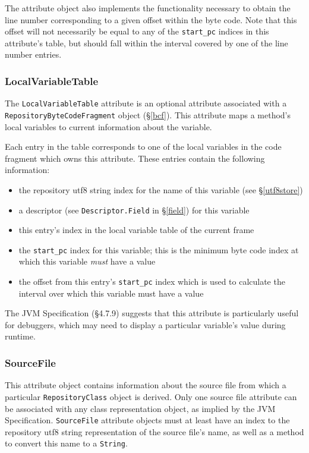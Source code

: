 \documentclass{report}
\begin{document}
The attribute object also implements the functionality necessary to
obtain the line number corresponding to a given offset within the 
byte code. Note that this offset will not necessarily be equal to
any of the \texttt{start\_pc} indices in this attribute's table, but should
fall within the interval covered by one of the line number entries.

\subsubsection{LocalVariableTable}

The \texttt{LocalVariableTable} attribute is an optional attribute associated
with a \texttt{Re\-pos\-i\-tory\-Byte\-Code\-Frag\-ment} object (\S \ref{bcf}).
This attribute maps a method's local variables to current information about 
the variable.

Each entry in the table corresponds to one of the local variables in the
code fragment which owns this attribute. These entries contain the
following information:

\begin{itemize}
	\item the repository utf8 string index for the name of this
	      variable (see \S \ref{utf8store})
	\item a descriptor (see \texttt{Descriptor.Field} in
              \S \ref{field}) for this variable
	\item this entry's index in the local variable table of the current
              frame
	\item the \texttt{start\_pc} index for this variable; this is
              the minimum byte code index at which this variable {\em must}
              have a value
	\item the offset from this entry's \texttt{start\_pc} index which
	      is used to calculate the interval over which this variable
              must have a value
\end{itemize}

The JVM Specification (\S 4.7.9) suggests that this attribute is 
particularly useful for debuggers, which may need to display
a particular variable's value during runtime.

\subsubsection{SourceFile}

This attribute object contains information about the source file from which a 
particular \texttt{Re\-pos\-i\-tory\-Class} object is derived. Only one source
file attribute can be associated with any class representation object, as 
implied by the JVM Specification. \texttt{SourceFile} attribute objects must 
at least have an index to the repository utf8 string representation of the
source file's name, as well as a method to convert this name to a 
\texttt{String}.
\end{document}
